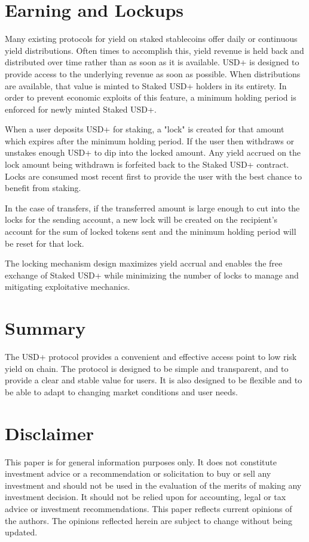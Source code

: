 \documentclass[sigconf,nonacm,prologue,table]{acmart}
\begin{document}
\section{Earning and Lockups}
\label{sec:lockups}

Many existing protocols for yield on staked stablecoins offer daily or continuous yield distributions. Often times to accomplish this, yield revenue is held back and distributed over time rather than as soon as it is available. USD+ is designed to provide access to the underlying revenue as soon as possible. When distributions are available, that value is minted to Staked USD+ holders in its entirety. In order to prevent economic exploits of this feature, a minimum holding period is enforced for newly minted Staked USD+.

When a user deposits USD+ for staking, a "lock" is created for that amount which expires after the minimum holding period. If the user then withdraws or unstakes enough USD+ to dip into the locked amount. Any yield accrued on the lock amount being withdrawn is forfeited back to the Staked USD+ contract. Locks are consumed most recent first to provide the user with the best chance to benefit from staking.

In the case of transfers, if the transferred amount is large enough to cut into the locks for the sending account, a new lock will be created on the recipient's account for the sum of locked tokens sent and the minimum holding period will be reset for that lock.

The locking mechanism design maximizes yield accrual and enables the free exchange of Staked USD+ while minimizing the number of locks to manage and mitigating exploitative mechanics.

\section{Summary}

The USD+ protocol provides a convenient and effective access point to low risk yield on chain. The protocol is designed to be simple and transparent, and to provide a clear and stable value for users. It is also designed to be flexible and to be able to adapt to changing market conditions and user needs.

% 
% 

\section*{Disclaimer}

This paper is for general information purposes only. It does not constitute investment advice or a recommendation or solicitation to buy or sell any investment and should not be used in the evaluation of the merits of making any investment decision. It should not be relied upon for accounting, legal or tax advice or investment recommendations.  This paper reflects current opinions of the authors. The opinions reflected herein are subject to change without being updated. 
\end{document}
